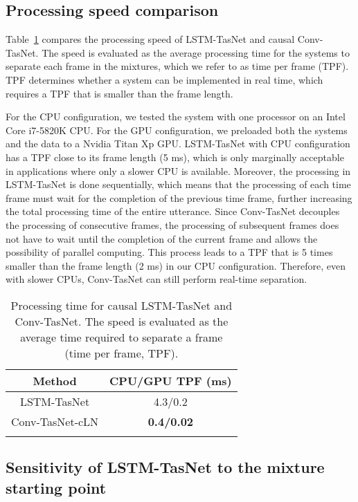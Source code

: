 \documentclass[journal]{IEEEtran}
\def\thline{\noalign{\hrule height 1.0pt}}
\begin{document}
\subsection{Processing speed comparison}

Table~\ref{tab:speed} compares the processing speed of LSTM-TasNet and causal Conv-TasNet. The speed is evaluated as the average processing time for the systems to separate each frame in the mixtures, which we refer to as time per frame (TPF). TPF determines whether a system can be implemented in real time, which requires a TPF that is smaller than the frame length. 

For the CPU configuration, we tested the system with one processor on an Intel Core i7-5820K CPU. For the GPU configuration, we preloaded both the systems and the data to a Nvidia Titan Xp GPU. LSTM-TasNet with CPU configuration has a TPF close to its frame length (5 ms), which is only marginally acceptable in applications where only a slower CPU is available. Moreover, the processing in LSTM-TasNet is done sequentially, which means that the processing of each time frame must wait for the completion of the previous time frame, further increasing the total processing time of the entire utterance. Since Conv-TasNet decouples the processing of consecutive frames, the processing of subsequent frames does not have to wait until the completion of the current frame and allows the possibility of parallel computing. This process leads to a TPF that is 5 times smaller than the frame length (2 ms) in our CPU configuration. Therefore, even with slower CPUs, Conv-TasNet can still perform real-time separation.

\begin{table}[!htbp]
	\small
	\centering
	\caption{Processing time for causal LSTM-TasNet and Conv-TasNet. The speed is evaluated as the average time required to separate a frame (time per frame, TPF).}
	\vspace{0.2cm}
	\label{tab:speed}
	\begin{tabular}{c|c}
		\thline
		Method & CPU/GPU TPF (ms) \\
		\hline
		LSTM-TasNet & 4.3/0.2 \\
		Conv-TasNet-cLN & \bf{0.4}/\bf{0.02} \\
		\thline
	\end{tabular}
\end{table}

\subsection{Sensitivity of LSTM-TasNet to the mixture starting point}
\end{document}
